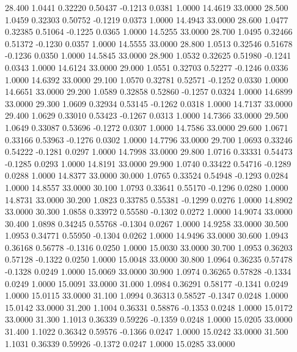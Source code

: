   28.400   1.0441   0.32220   0.50437  -0.1213   0.0381   1.0000  14.4619  33.0000
  28.500   1.0459   0.32303   0.50752  -0.1219   0.0373   1.0000  14.4943  33.0000
  28.600   1.0477   0.32385   0.51064  -0.1225   0.0365   1.0000  14.5255  33.0000
  28.700   1.0495   0.32466   0.51372  -0.1230   0.0357   1.0000  14.5555  33.0000
  28.800   1.0513   0.32546   0.51678  -0.1236   0.0350   1.0000  14.5845  33.0000
  28.900   1.0532   0.32625   0.51980  -0.1241   0.0343   1.0000  14.6124  33.0000
  29.000   1.0551   0.32703   0.52277  -0.1246   0.0336   1.0000  14.6392  33.0000
  29.100   1.0570   0.32781   0.52571  -0.1252   0.0330   1.0000  14.6651  33.0000
  29.200   1.0589   0.32858   0.52860  -0.1257   0.0324   1.0000  14.6899  33.0000
  29.300   1.0609   0.32934   0.53145  -0.1262   0.0318   1.0000  14.7137  33.0000
  29.400   1.0629   0.33010   0.53423  -0.1267   0.0313   1.0000  14.7366  33.0000
  29.500   1.0649   0.33087   0.53696  -0.1272   0.0307   1.0000  14.7586  33.0000
  29.600   1.0671   0.33166   0.53963  -0.1276   0.0302   1.0000  14.7796  33.0000
  29.700   1.0693   0.33246   0.54222  -0.1281   0.0297   1.0000  14.7998  33.0000
  29.800   1.0716   0.33331   0.54473  -0.1285   0.0293   1.0000  14.8191  33.0000
  29.900   1.0740   0.33422   0.54716  -0.1289   0.0288   1.0000  14.8377  33.0000
  30.000   1.0765   0.33524   0.54948  -0.1293   0.0284   1.0000  14.8557  33.0000
  30.100   1.0793   0.33641   0.55170  -0.1296   0.0280   1.0000  14.8731  33.0000
  30.200   1.0823   0.33785   0.55381  -0.1299   0.0276   1.0000  14.8902  33.0000
  30.300   1.0858   0.33972   0.55580  -0.1302   0.0272   1.0000  14.9074  33.0000
  30.400   1.0898   0.34245   0.55768  -0.1304   0.0267   1.0000  14.9258  33.0000
  30.500   1.0953   0.34771   0.55950  -0.1304   0.0262   1.0000  14.9496  33.0000
  30.600   1.0943   0.36168   0.56778  -0.1316   0.0250   1.0000  15.0030  33.0000
  30.700   1.0953   0.36203   0.57128  -0.1322   0.0250   1.0000  15.0048  33.0000
  30.800   1.0964   0.36235   0.57478  -0.1328   0.0249   1.0000  15.0069  33.0000
  30.900   1.0974   0.36265   0.57828  -0.1334   0.0249   1.0000  15.0091  33.0000
  31.000   1.0984   0.36291   0.58177  -0.1341   0.0249   1.0000  15.0115  33.0000
  31.100   1.0994   0.36313   0.58527  -0.1347   0.0248   1.0000  15.0142  33.0000
  31.200   1.1004   0.36331   0.58876  -0.1353   0.0248   1.0000  15.0172  33.0000
  31.300   1.1013   0.36339   0.59226  -0.1359   0.0248   1.0000  15.0205  33.0000
  31.400   1.1022   0.36342   0.59576  -0.1366   0.0247   1.0000  15.0242  33.0000
  31.500   1.1031   0.36339   0.59926  -0.1372   0.0247   1.0000  15.0285  33.0000
